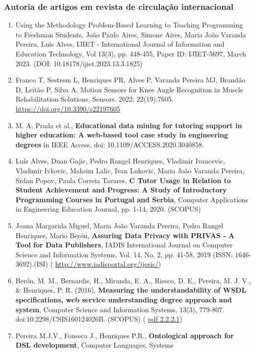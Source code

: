 \documentclass[11pt]{article}
\begin{document}
\subsubsection{Autoria de artigos em revista de circulação internacional}
\begin{enumerate}
\item{ Using the Methodology Problem-Based Learning to Teaching Programming to Freshman Students, João Paulo Aires, Simone Aires, Maria João Varanda Pereira, Luís Alves, IJIET - International Journal of Information and Education Technology, Vol 13(3), pp. 448-455, Paper ID:  IJIET-5697, March 2023. (DOI: 10.18178/ijiet.2023.13.3.1825)}
\item{ Franco T, Sestrem L, Henriques PR, Alves P, Varanda Pereira MJ, Brandão D, Leitão P, Silva A. Motion Sensors for Knee Angle Recognition in Muscle Rehabilitation Solutions. Sensors. 2022; 22(19):7605. 
\url{https://doi.org/10.3390/s22197605}}
\item{ M. A. Prada et al., {
\bf{{Educational data mining for tutoring support in higher education: A web-based tool case study in engineering degrees}}} in IEEE Access, doi: 10.1109/ACCESS.2020.3040858.}
\item{ Luís Alves, Duan Gajic, Pedro Rangel Henriques, Vladimir Ivancevic, Vladimir Ivkovic, Maksim Lalic, Ivan Lukovic, Maria João Varanda Pereira, Srdan Popov, Paula Correia Tavares, {
\bf{ C Tutor Usage in Relation to Student Achievement and Progress: A Study of Introductory Programming Courses in Portugal and Serbia}}, Computer Applications in Engineering Education Journal, pp. 1-14, 2020. (SCOPUS)}
\item{ Joana Margarida Miguel, Maria João Varanda Pereira, Pedro Rangel Henriques, Mario Berón, {
\bf{{Assuring Data Privacy with PRIVAS - A Tool for Data Publishers}}}, IADIS International Journal on Computer Science and Information Systems, Vol. 14, No. 2, pp. 41-58, 2019 (ISSN: 1646-3692).(ISI) (
\url{http://www.iadisportal.org/ijcsis/})}
\item{ Berón, M. M., Bernardis, H., Miranda, E. A., Riesco, D. E., Pereira, M. J. V., & Henriques, P. R. (2016), {
\bf{{Measuring the understandability of WSDL specifications, web service understanding degree approach and system}}}, Computer Science and Information Systems, 13(3), 779-807. doi:10.2298/CSIS160124026B. (SCOPUS) (
\href{run:Publicacoes/publicacoes/93.pdf}{pdf 2.2.2.1})}
\item{ Pereira M.J.V., Fonseca J., Henriques P.R., {
\bf{ Ontological approach for DSL development}}, Computer Languages, Systems 
}
\end{enumerate}
\end{document}
